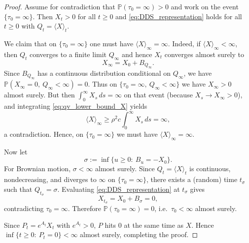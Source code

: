 \documentclass[10pt,a4paper]{amsart}
\begin{document}
\begin{proof}
Assume for contradiction that $\mathbb P(\tau_0=\infty)>0$ and work on the event $\{\tau_0=\infty\}$.
Then $X_t>0$ for all $t\ge0$ and \eqref{eq:DDS_representation} holds for all $t\ge0$ with $Q_t=\langle X\rangle_t$.

We claim that on $\{\tau_0=\infty\}$ one must have $\langle X\rangle_\infty=\infty$.
Indeed, if $\langle X\rangle_\infty<\infty$, then $Q_t$ converges to a finite limit $Q_\infty$ and hence
$X_t$ converges almost surely to
\[
X_\infty = X_0 + B_{Q_\infty}.
\]
Since $B_{Q_\infty}$ has a continuous distribution conditional on $Q_\infty$, we have
$\mathbb P(X_\infty=0,\ Q_\infty<\infty)=0$.
Thus on $\{\tau_0=\infty,\ Q_\infty<\infty\}$ we have $X_\infty>0$ almost surely.
But then $\int_0^\infty X_s\,ds=\infty$ on that event (because $X_s\to X_\infty>0$), and integrating
\eqref{eq:qv_lower_bound_X} yields
\[
\langle X\rangle_\infty
\ge \rho^2 c\int_0^\infty X_s\,ds
= \infty,
\]
a contradiction. Hence, on $\{\tau_0=\infty\}$ we must have $\langle X\rangle_\infty=\infty$.

Now let
\[
\sigma:=\inf\{u\ge0:\ B_u=-X_0\}.
\]
For Brownian motion, $\sigma<\infty$ almost surely.
Since $Q_t=\langle X\rangle_t$ is continuous, nondecreasing, and diverges to $\infty$ on $\{\tau_0=\infty\}$, there
exists a (random) time $t_\sigma$ such that $Q_{t_\sigma}=\sigma$.
Evaluating \eqref{eq:DDS_representation} at $t_\sigma$ gives
\[
X_{t_\sigma}=X_0+B_{\sigma}=0,
\]
contradicting $\tau_0=\infty$.
Therefore $\mathbb P(\tau_0=\infty)=0$, i.e.\ $\tau_0<\infty$ almost surely.

Since $P_t=e^{A_t}X_t$ with $e^{A_t}>0$, $P$ hits $0$ at the same time as $X$.
Hence $\inf\{t\ge0:\ P_t=0\}<\infty$ almost surely, completing the proof.
\end{proof}
\end{document}
